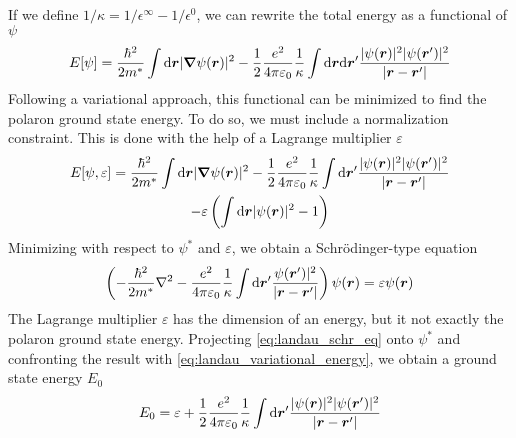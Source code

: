 If we define $1/\kappa = 1/\epsilon^\infty - 1/\epsilon^0$, we can rewrite the total energy as a functional of $\psi$
\begin{equation}
    E[\psi] = \frac{\hbar^2}{2m^*} \int \differential\vec{r} |\grad \psi(\vec{r})|^2 - \oh \frac{e^2}{4\pi\varepsilon_0} \frac{1}{\kappa} \int \differential \vec{r} \differential \vec{r}' \frac{|\psi(\vec{r})|^2|\psi(\vec{r}')|^2}{|\vec{r}-\vec{r}'|}
\end{equation}
Following a variational approach, this functional can be minimized to find the polaron ground state energy. To do so, we must include a normalization constraint. This is done with the help of a Lagrange multiplier $\varepsilon$
\begin{multline} \label{eq:landau_variational_energy}
    E[\psi, \varepsilon] = \frac{\hbar^2}{2m^*} \int \differential\vec{r} |\grad \psi(\vec{r})|^2 - \oh \frac{e^2}{4\pi\varepsilon_0} \frac{1}{\kappa} \int \differential \vec{r}' \frac{|\psi(\vec{r})|^2|\psi(\vec{r}')|^2}{|\vec{r}-\vec{r}'|}
    \\ - \varepsilon \left( \int \differential\vec{r} |\psi(\vec{r})|^2 -1 \right)
\end{multline}
Minimizing with respect to $\psi^*$ and $\varepsilon$, we obtain a Schr\"{o}dinger-type equation
\begin{equation} \label{eq:landau_schr_eq}
    \left(-\frac{\hbar^2}{2m^*} \laplacian - \frac{e^2}{4\pi\varepsilon_0} \frac{1}{\kappa} \int \differential \vec{r}' \frac{\psi(\vec{r}')|^2}{|\vec{r}-\vec{r}'|} \right) \psi(\vec{r}) = \varepsilon \psi(\vec{r})
\end{equation}
The Lagrange multiplier $\varepsilon$ has the dimension of an energy, but it not exactly the polaron ground state energy. Projecting \cref{eq:landau_schr_eq} onto $\psi^*$ and confronting the result with \cref{eq:landau_variational_energy}, we obtain a ground state energy $E_0$
\begin{equation}
    E_0 = \varepsilon + \oh \frac{e^2}{4\pi\varepsilon_0} \frac{1}{\kappa} \int \differential \vec{r}' \frac{|\psi(\vec{r})|^2|\psi(\vec{r}')|^2}{|\vec{r}-\vec{r}'|}
\end{equation}

